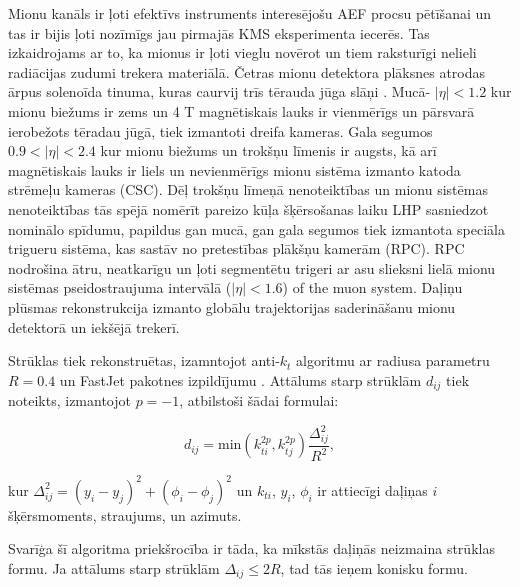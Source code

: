 Mionu kanāls ir ļoti efektīvs instruments interesējošu \gls{AEF} procsu pētīšanai un tas ir bijis ļoti nozīmīgs jau pirmajās KMS eksperimenta iecerēs. Tas izkaidrojams ar to, ka mionus ir ļoti vieglu novērot un tiem raksturīgi nelieli radiācijas zudumi trekera materiālā. Četras mionu detektora plāksnes atrodas ārpus solenoīda tinuma, kuras caurvij trīs tērauda jūga slāņi \cite{muon_tech_rep}. Mucā- $\left|\eta\right|<1.2$ kur mionu biežums ir zems un 4 T magnētiskais lauks ir vienmērīgs un pārsvarā ierobežots tēradau jūgā, tiek izmantoti dreifa kameras. Gala segumos $0.9<\left|\eta\right|<2.4$ kur mionu biežums un trokšņu līmenis ir augsts, kā arī magnētiskais lauks ir liels un nevienmērīgs mionu sistēma izmanto katoda strēmeļu kameras (CSC). Dēļ trokšņu līmeņā nenoteiktības un mionu sistēmas nenoteiktības tās spējā nomērīt pareizo kūļa šķērsošanas laiku LHP sasniedzot nominālo spīdumu, papildus gan mucā, gan gala segumos tiek izmantota speciāla trigueru sistēma, kas sastāv no pretestības plākšņu kamerām (RPC). RPC nodrošina ātru, neatkarīgu un ļoti segmentētu trigeri ar asu \pt slieksni lielā mionu sistēmas pseidostraujuma intervālā ($\left|\eta\right|<1.6$) of the muon system. Daļiņu plūsmas rekonstrukcija izmanto globālu trajektorijas saderināšanu mionu detektorā un iekšējā trekerī. 

Strūklas tiek rekonstruētas, izamntojot anti-$k_{t}$ algoritmu \cite{Cacciari:2008gp} ar radiusa parametru $R=0.4$ un FastJet pakotnes izpildījumu \cite{Cacciari:2011ma}. Attālums starp strūklām $d_{ij}$ tiek noteikts, izmantojot $p=-1$, atbilstoši šādai formulai:

\begin{equation}
d_{ij}=\text{min}(k_{ti}^{2p}, k_{tj}^{2p})\frac{\Delta_{ij}^{2}}{R^{2}},
\end{equation}

kur $\Delta_{ij}^{2} = (y_{i}-y_{j})^{2} + (\phi_{i} - \phi_{j})^{2}$ un $k_{ti}$, $y_{i}$, $\phi_{i}$ ir attiecīgi daļiņas $i$ šķērsmoments, straujums, un azimuts. 

Svarīģa šī algoritma priekšrocība ir tāda, ka \gls{mīkstās} daļiņās neizmaina strūklas formu. Ja attālums starp strūklām $\Delta_{ij}\leq2R$, tad tās ieņem konisku formu. 

